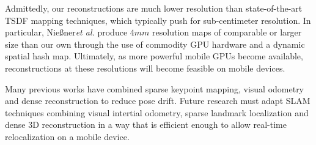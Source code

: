\documentclass[conference]{IEEEtran}
\newcommand{\etal}{\textit{et al.}\xspace}
\newcommand{\Tango}{\textit{Tango}\xspace}
\newcommand{\TSDF}{TSDF\xspace}
\newcommand{\Niessner}{Nie{\ss}ner\xspace}
\newif\iffinalcopy
\begin{document}
Admittedly, our reconstructions are much lower resolution than state-of-the-art
\TSDF mapping techniques, which typically push for sub-centimeter resolution. In
particular, \Niessner \etal \cite{NiessnerHashing} produce $4mm$ resolution maps
of comparable or larger size than our own through the use of commodity GPU
hardware and a dynamic spatial hash map. Ultimately, as more powerful mobile
GPUs become available, reconstructions at these resolutions will become
feasible on mobile devices. 

Many previous works \cite{StuecklerSparseDense, niessner2014combining} have
combined sparse keypoint mapping, visual odometry and dense reconstruction to
reduce pose drift. Future research must adapt SLAM techniques combining visual
intertial odometry, sparse landmark localization and dense 3D reconstruction in
a way that is efficient enough to allow real-time relocalization on a mobile device.




\iffinalcopy
	\section*{Acknowledgements}
	This work was done as part of Google's Advanced Technologies and Projects
	division (ATAP) for \Tango. Thanks to Johnny Lee, Joel Hesch, Esha
	Nerurkar, and Simon Lynen and other ATAP members for their close collaboration
	and support on this project. Thanks to Ryan Hickman for collecting outdoor data.
\fi



 
\end{document}
